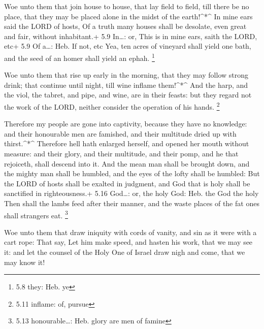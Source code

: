  Woe unto them that join house to house, that lay field to
field, till there be no place, that they may be placed alone in the
midst of the earth!\^{}*\^{}  In mine ears said the LORD of
hosts, Of a truth many houses shall be desolate, even great and fair,
without inhabitant.+ 5.9 In\ldots: or, This is in mine ears, saith the
LORD, etc+ 5.9 Of a\ldots: Heb. If not, etc  Yea, ten acres
of vineyard shall yield one bath, and the seed of an homer shall yield
an ephah. \footnote{5.8 they: Heb. ye}

 Woe unto them that rise up early in the morning, that they
may follow strong drink; that continue until night, till wine inflame
them!\^{}*\^{}  And the harp, and the viol, the tabret, and
pipe, and wine, are in their feasts: but they regard not the work of the
LORD, neither consider the operation of his hands. \footnote{5.11
  inflame: of, pursue}

 Therefore my people are gone into captivity, because they
have no knowledge: and their honourable men are famished, and their
multitude dried up with thirst.\^{}*\^{}  Therefore hell
hath enlarged herself, and opened her mouth without measure: and their
glory, and their multitude, and their pomp, and he that rejoiceth, shall
descend into it.  And the mean man shall be brought down,
and the mighty man shall be humbled, and the eyes of the lofty shall be
humbled:  But the LORD of hosts shall be exalted in
judgment, and God that is holy shall be sanctified in righteousness.+
5.16 God\ldots: or, the holy God: Heb. the God the holy 
Then shall the lambs feed after their manner, and the waste places of
the fat ones shall strangers eat. \footnote{5.13 honourable\ldots: Heb.
  glory are men of famine}

 Woe unto them that draw iniquity with cords of vanity, and
sin as it were with a cart rope:  That say, Let him make
speed, and hasten his work, that we may see it: and let the counsel of
the Holy One of Israel draw nigh and come, that we may know it!


